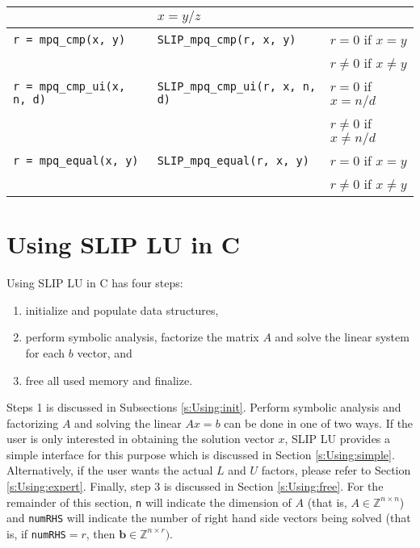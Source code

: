 \documentclass[12pt]{article}
\theoremstyle{definition}
\begin{document}
{\begin{center}
\begin{tabular}{|l|l|l|}
    & $x = y/z$ \\ \hline
\verb|r = mpq_cmp(x, y)|
    & \verb|SLIP_mpq_cmp(r, x, y)|
    & $r = 0$ if $x=y$\\&&  $r\neq 0$ if $x\neq y$ \\ \hline
\verb|r = mpq_cmp_ui(x, n, d)|
    & \verb|SLIP_mpq_cmp_ui(r, x, n, d)|
    & $r = 0$ if $x=n/d$\\&& $r\neq 0$ if $x\neq n/d$ \\ \hline
\verb|r = mpq_equal(x, y)|
    & \verb|SLIP_mpq_equal(r, x, y)|
    & $r = 0$ if $x=y$\\&&  $r\neq 0$ if $x\neq y$ \\ \hline
\end{tabular}
\end{center}
}

\cprotect\section{Using SLIP LU in C} \label{s:Using}

Using SLIP LU in C has four steps:

\begin{enumerate}
\item initialize and populate data structures,
\item perform symbolic analysis,
factorize the matrix $A$ and solve the linear
system for each $b$ vector, and
\item free all used memory and finalize.
\end{enumerate}

Steps 1 is discussed in Subsections \ref{s:Using:init}.
Perform symbolic analysis and factorizing $A$ and solving the linear $A x =b$
can be done in one of two ways. If the user is only interested in
obtaining the solution vector $x$, SLIP LU provides a simple interface
for this purpose which is discussed in Section \ref{s:Using:simple}.
Alternatively, if the user wants the actual $L$ and $U$ factors, please refer
to Section \ref{s:Using:expert}. Finally, step 3 is discussed in Section
\ref{s:Using:free}. For the remainder of this section, \verb|n| will indicate
the dimension of $A$ (that is, $A \in \mathbb{Z}^{n \times n}$) and
\verb|numRHS| will indicate the number of right hand side vectors being solved
(that is, if \verb|numRHS|$= r$, then $\mathbf{b} \in \mathbb{Z}^{n \times
r})$.
\end{document}
